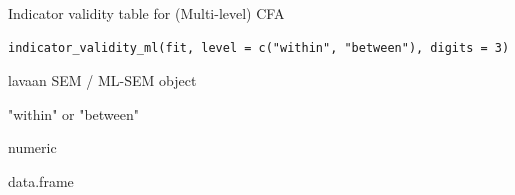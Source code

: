 \documentclass[a4paper]{book}
\begin{document}
%
\begin{Description}
Indicator validity table for (Multi-level) CFA
\end{Description}
%
\begin{Usage}
\begin{verbatim}
indicator_validity_ml(fit, level = c("within", "between"), digits = 3)
\end{verbatim}
\end{Usage}
%
\begin{Arguments}
\begin{ldescription}
\item[\code{fit}] lavaan SEM / ML-SEM object

\item[\code{level}] "within" or "between"

\item[\code{digits}] numeric
\end{ldescription}
\end{Arguments}
%
\begin{Value}
data.frame
\end{Value}
\end{document}
